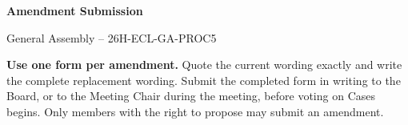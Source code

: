 \documentclass{../../Common/Latex/Templates/rapport}
\date{\meetingdate, \meetingtime}
\begin{document}
\reportmainmatter
\small
\setlength{\parindent}{0pt}
\setlength{\tabcolsep}{6pt}
\renewcommand{\arraystretch}{1.2}

\begin{center}
  {\Large\bfseries Amendment Submission}\par
  \vspace{0.15cm}
  {\normalsize General Assembly -- 26H-ECL-GA-PROC5}\par
  \vspace{0.1cm}
  {\small \meetingline}\par
\end{center}

\vspace{0.2cm}
\textbf{Use one form per amendment.} Quote the current wording exactly and write the complete replacement wording. Submit the completed form in writing to the Board, or to the Meeting Chair during the meeting, before voting on Cases begins. Only members with the right to propose may submit an amendment.
\end{document}
